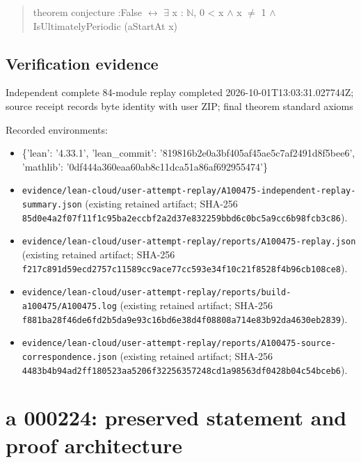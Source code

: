 \documentclass[11pt,a4paper]{article}
\begin{document}
\begin{quote}\small\ttfamily theorem conjecture :\newline False \ensuremath{\leftrightarrow} \ensuremath{\exists} x : \ensuremath{\mathbb{N}}, 0 < x \ensuremath{\wedge} x \ensuremath{\neq} 1 \ensuremath{\wedge} IsUltimatelyPeriodic (aStartAt x)\end{quote}
\subsection{Verification evidence}
Independent complete 84-module replay completed 2026-10-01T13:03:31.027744Z; source receipt records byte identity with user ZIP; final theorem standard axioms

Recorded environments:

\begin{itemize}
\item \{'lean': '4.33.1', 'lean\_commit': '819816b2e0a3bf405af45ae5c7af2491d8f5bee6', 'mathlib': '0df444a360eaa60ab8c11dca51a86af692955474'\}
\end{itemize}
\begin{itemize}
\item \texttt{evidence/lean-cloud/user-attempt-replay/A100475-independent-replay-summary.json} (existing retained artifact; SHA-256 \texttt{85d0e4a2f07f11f1c95ba2eccbf2a2d37e832259bbd6c0bc5a9cc6b98fcb3c86}).
\end{itemize}
\begin{itemize}
\item \texttt{evidence/lean-cloud/user-attempt-replay/reports/A100475-replay.json} (existing retained artifact; SHA-256 \texttt{f217c891d59ecd2757c11589cc9ace77cc593e34f10c21f8528f4b96cb108ce8}).
\end{itemize}
\begin{itemize}
\item \texttt{evidence/lean-cloud/user-attempt-replay/reports/build-a100475/A100475.log} (existing retained artifact; SHA-256 \texttt{f881ba28f46de6fd2b5da9e93c16bd6e38d4f08808a714e83b92da4630eb2839}).
\end{itemize}
\begin{itemize}
\item \texttt{evidence/lean-cloud/user-attempt-replay/reports/A100475-source-correspondence.json} (existing retained artifact; SHA-256 \texttt{4483b4b94ad2ff180523aa5206f32256357248cd1a98563df0428b04c54bceb6}).
\end{itemize}
\clearpage
\section{a 000224: preserved statement and proof architecture}
\end{document}
